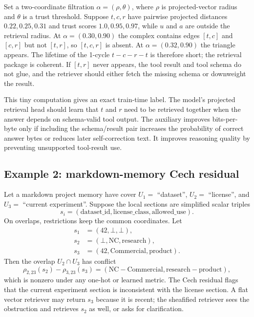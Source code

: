 \documentclass[11pt]{article}
\numberwithin{equation}{section}
\begin{document}
Set a two-coordinate filtration $\alpha=(\rho,\theta)$, where $\rho$ is projected-vector radius and $\theta$ is a trust threshold. Suppose $t,c,r$ have pairwise projected distances $0.22,0.25,0.31$ and trust scores $1.0,0.95,0.97$, while $u$ and $a$ are outside the retrieval radius. At $\alpha=(0.30,0.90)$ the complex contains edges $[t,c]$ and $[c,r]$ but not $[t,r]$, so $[t,c,r]$ is absent. At $\alpha=(0.32,0.90)$ the triangle appears. The lifetime of the 1-cycle $t-c-r-t$ is therefore short; the retrieval package is coherent. If $[t,r]$ never appears, the tool result and tool schema do not glue, and the retriever should either fetch the missing schema or downweight the result.

This tiny computation gives an exact train-time label. The model's projected retrieval head should learn that $t$ and $r$ need to be retrieved together when the answer depends on schema-valid tool output. The auxiliary improves bits-per-byte only if including the schema/result pair increases the probability of correct answer bytes or reduces later self-correction text. It improves reasoning quality by preventing unsupported tool-result use.

\subsection{Example 2: markdown-memory Cech residual}
Let a markdown project memory have cover $U_1=$ ``dataset'', $U_2=$ ``license'', and $U_3=$ ``current experiment''. Suppose the local sections are simplified scalar triples
\begin{equation}
s_i=(\mathrm{dataset\_id},\mathrm{license\_class},\mathrm{allowed\_use}).
\end{equation}
On overlaps, restrictions keep the common coordinates. Let
\begin{align}
s_1&=(42,\bot,\bot),\\
s_2&=(\bot,\mathrm{NC},\mathrm{research}),\\
s_3&=(42,\mathrm{Commercial},\mathrm{product}).
\end{align}
Then the overlap $U_2\cap U_3$ has conflict
\begin{equation}
\rho_{2,23}(s_2)-\rho_{3,23}(s_3)=(\mathrm{NC}-\mathrm{Commercial},\mathrm{research}-\mathrm{product}),
\end{equation}
which is nonzero under any one-hot or learned metric. The Cech residual flags that the current experiment section is inconsistent with the license section. A flat vector retriever may return $s_3$ because it is recent; the sheafified retriever sees the obstruction and retrieves $s_2$ as well, or asks for clarification.
\end{document}
